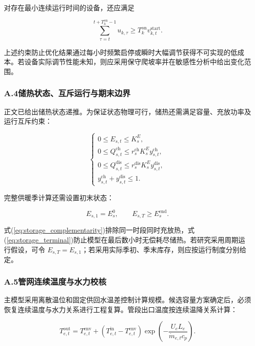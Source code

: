 对存在最小连续运行时间的设备，还应满足

\begin{equation}
\sum_{\tau=t}^{t+T_k^{\mathrm{on}}-1}u_{k,\tau}
\geq T_k^{\mathrm{on}}v_{k,t}^{\mathrm{start}}.
\label{eq:min_on_time}
\end{equation}

上述约束防止优化结果通过每小时频繁启停或瞬时大幅调节获得不可实现的低成本。若设备实际调节性能未知，则应采用保守爬坡率并在敏感性分析中给出变化范围。

\subsubsection*{A.4\quad 储热状态、互斥运行与期末边界}

正文已给出储热状态递推。为保证状态物理可行，储热还需满足容量、充放功率及运行互斥约束：

\begin{equation}
\begin{cases}
0\leq E_{s,t}\leq K_s^E,\\
0\leq Q_{s,t}^{\mathrm{ch}}\leq r_s^{\mathrm{ch}}K_s^Ey_{s,t}^{\mathrm{ch}},\\
0\leq Q_{s,t}^{\mathrm{dis}}\leq r_s^{\mathrm{dis}}K_s^Ey_{s,t}^{\mathrm{dis}},\\
y_{s,t}^{\mathrm{ch}}+y_{s,t}^{\mathrm{dis}}\leq1.
\end{cases}
\label{eq:storage_complementarity}
\end{equation}

完整供暖季计算还需设置初末状态：

\begin{equation}
E_{s,1}=E_s^{0},
\qquad
E_{s,T}\geq E_s^{\mathrm{end}}.
\label{eq:storage_terminal}
\end{equation}

式(\ref{eq:storage_complementarity})排除同一时段同时充放热，式(\ref{eq:storage_terminal})防止模型在最后数小时无偿耗尽储热。若研究采用周期运行假设，可令 $E_{s,T}=E_{s,1}$；若采用实际季初、季末库存，则应按运行制度分别给定。

\subsubsection*{A.5\quad 管网连续温度与水力校核}

主模型采用离散温位和固定供回水温差控制计算规模。候选容量方案确定后，必须恢复连续温度与水力关系进行工程复算。管段出口温度按连续温降关系计算：

\begin{equation}
T_{e,t}^{\mathrm{out}}
=T_{e,t}^{\mathrm{env}}
+\left(T_{e,t}^{\mathrm{in}}-T_{e,t}^{\mathrm{env}}\right)
\exp\left(-\frac{U_eL_e}{\dot m_{e,t}c_p}\right).
\label{eq:temperature_drop}
\end{equation}

